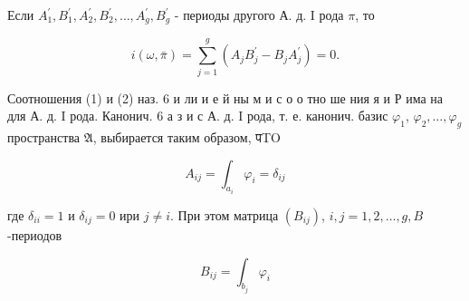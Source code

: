 \documentclass[10pt]{article}
\begin{document}
Если $A_{1}^{\prime}, B_{1}^{\prime}, A_{2}^{\prime}, B_{2}^{\prime}, \ldots, A_{g}^{\prime}, B_{g}^{\prime}$ - периоды другого А. д. I рода $\pi$, то

\[
i(\omega, \bar{\pi})=\sum_{j=1}^{g}\left(A_{j} B_{j}^{\prime}-B_{j} A_{j}^{\prime}\right)=0 .
\]

Соотношения (1) и (2) наз. 6 и ли и е й ны м и с о о тно ше ния я и Р има на для А. д. I рода. Канонич. 6 а з и с А. д. I рода, т. е. канонич. базис $\varphi_{1}$, $\varphi_{2}, \ldots, \varphi_{g}$ пространства $\mathfrak{A}$, выбирается таким образом, पTO

\[
A_{i j}=\int_{a_{i}} \varphi_{i}=\delta_{i j}
\]

где $\delta_{i i}=1$ и $\delta_{i j}=0$ ири $j \neq i$. При этом матрица $\left(B_{i j}\right)$, $i, j=1,2, \ldots, g, B$-периодов

\[
B_{i j}=\int_{b_{j}} \varphi_{i}
\]
\end{document}
